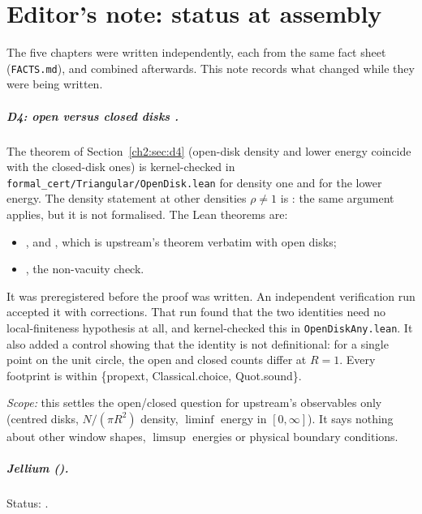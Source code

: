 \chapter*{Editor's note: status at assembly}
The five chapters were written independently, each from the same fact sheet (\texttt{FACTS.md}), and combined
afterwards. This note records what changed while they were being written.

\paragraph{D4: open versus closed disks \tierA.} The theorem of Section~\ref{ch2:sec:d4} (open-disk density and lower
energy coincide with the closed-disk ones) is kernel-checked in \texttt{formal\_cert/Triangular/OpenDisk.lean} for
density one and for the lower energy. The density statement at other densities $\rho\ne1$ is \tierC{}: the same
argument applies, but it is not formalised. The Lean theorems are:
\begin{itemize}
\item {},  and , which is
upstream's theorem verbatim with open disks;
\item {}, the non-vacuity check.
\end{itemize}
It was preregistered before the proof was written. An independent verification run accepted it with corrections. That
run found that the two identities need no local-finiteness hypothesis at all, and kernel-checked this in
\texttt{OpenDiskAny.lean}. It also added a control showing that the identity is not definitional: for a single point on
the unit circle, the open and closed counts differ at $R=1$. Every footprint is within \{propext, Classical.choice,
Quot.sound\}.

\emph{Scope:} this settles the open/closed question for upstream's observables only (centred disks, $N/(\pi R^2)$
density, $\liminf$ energy in $[0,\infty]$). It says nothing about other window shapes, $\limsup$ energies or physical
boundary conditions.

\paragraph{Jellium (\tierX).} Status: \JelliumMainStatus.

